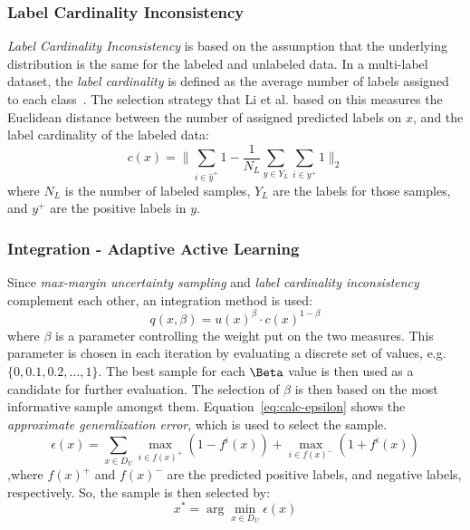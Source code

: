 \subsubsection{Label Cardinality Inconsistency}

\textit{Label Cardinality Inconsistency} is based on the assumption that the underlying distribution is the same for the labeled and unlabeled data.
In a multi-label dataset, the \textit{label cardinality} is defined as the average number of labels assigned to each class~\cite{tsoumakas2006multi}.
The selection strategy that Li et al\@. based on this measures the Euclidean distance between the number of assigned predicted labels on $x$, and the label cardinality of the labeled data:
\begin{equation}
    c(x) = \bigg \lVert \sum_{i \in \hat{y}^+} 1 - \frac{1}{N_L} \sum_{y \in Y_L} \sum_{i \in y^+} 1 \bigg \rVert_2
\end{equation}
where $N_L$ is the number of labeled samples, $Y_L$ are the labels for those samples, and $y^+$ are the positive labels in $y$.

\subsubsection{Integration - Adaptive Active Learning}

Since \textit{max-margin uncertainty sampling} and \textit{label cardinality inconsistency} complement each other, an integration method is used:
\begin{equation}\label{eq:approx-generalization-error}
    q(x, \beta) = u(x)^\beta \cdot c(x)^{1-\beta}
\end{equation}
where $\beta$ is a parameter controlling the weight put on the two measures.
This parameter is chosen in each iteration by evaluating a discrete set of values, e.g. $\{0, 0.1, 0.2, \dots, 1\}$.
The best sample for each $\Beta$ value is then used as a candidate for further evaluation.
The selection of $\beta$ is then based on the most informative sample amongst them.
Equation~\ref{eq:calc-epsilon} shows the \textit{approximate generalization error}, which is used to select the sample.
\begin{equation}\label{eq:calc-epsilon}
    \epsilon(x) = \sum_{x \in D_U} \max_{i \in f(x)^+}(1-f^i(x)) + \max_{i \in f(x)^-}(1+f^i(x))
\end{equation}
,where $f(x)^+$ and $f(x)^-$ are the predicted positive labels, and negative labels, respectively.
So, the sample is then selected by:
\begin{equation}\label{eq:x-star}
    x^* = \arg \min_{x \in D_U} \epsilon(x)
\end{equation}

